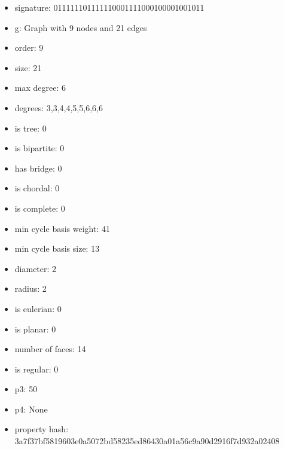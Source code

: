 \newpage
\begin{figure}
\end{figure}
\begin{itemize}
\item signature: 011111101111110001111000100001001011
\item g: Graph with 9 nodes and 21 edges
\item order: 9
\item size: 21
\item max degree: 6
\item degrees: 3,3,4,4,5,5,6,6,6
\item is tree: 0
\item is bipartite: 0
\item has bridge: 0
\item is chordal: 0
\item is complete: 0
\item min cycle basis weight: 41
\item min cycle basis size: 13
\item diameter: 2
\item radius: 2
\item is eulerian: 0
\item is planar: 0
\item number of faces: 14
\item is regular: 0
\item p3: 50
\item p4: None
\item property hash: 3a7f37bf5819603e0a5072bd58235ed86430a01a56c9a90d2916f7d932a02408
\end{itemize}
